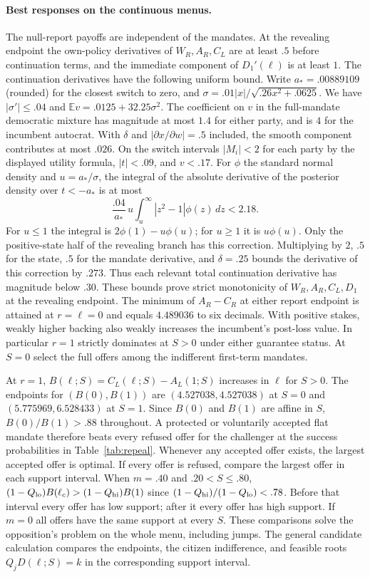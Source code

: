 \documentclass[11pt,letterpaper]{article}
\newcommand{\E}{\mathbb E}
\begin{document}
\paragraph{Best responses on the continuous menus.}
The null-report payoffs are independent of the mandates. At the revealing endpoint the own-policy derivatives of $W_R,A_R,C_L$ are at least $.5$ before continuation terms, and the immediate component of $D_1'(\ell)$ is at least $1$. The continuation derivatives have the following uniform bound. Write $a_* = .00889109$ (rounded) for the closest switch to zero, and $\sigma=.01|x|/\sqrt{.26x^2+.0625}$. We have $|\sigma'|\le .04$ and $\E v=.0125+32.25\sigma^2$. The coefficient on $v$ in the full-mandate democratic mixture has magnitude at most $1.4$ for either party, and is $4$ for the incumbent autocrat. With $\delta$ and $|\partial x/\partial w|=.5$ included, the smooth component contributes at most $.026$. On the switch intervals $|M_i|<2$ for each party by the displayed utility formula, $|t|<.09$, and $v<.17$. For $\phi$ the standard normal density and $u=a_*/\sigma$, the integral of the absolute derivative of the posterior density over $t<-a_*$ is at most
\[
 \frac{.04}{a_*}\,u\int_u^\infty |z^2-1|\phi(z)\,dz < 2.18 .
\]
For $u\le1$ the integral is $2\phi(1)-u\phi(u)$; for $u\ge1$ it is $u\phi(u)$. Only the positive-state half of the revealing branch has this correction. Multiplying by $2$, $.5$ for the state, $.5$ for the mandate derivative, and $\delta=.25$ bounds the derivative of this correction by $.273$. Thus each relevant total continuation derivative has magnitude below $.30$. These bounds prove strict monotonicity of $W_R,A_R,C_L,D_1$ at the revealing endpoint. The minimum of $A_R-C_R$ at either report endpoint is attained at $r=\ell=0$ and equals $4.489036$ to six decimals. With positive stakes, weakly higher backing also weakly increases the incumbent's post-loss value. In particular $r=1$ strictly dominates at $S>0$ under either guarantee status. At $S=0$ select the full offers among the indifferent first-term mandates.

At $r=1$, $B(\ell;S)=C_L(\ell;S)-A_L(1;S)$ increases in $\ell$ for $S>0$. The endpoints for $(B(0),B(1))$ are $(4.527038,4.527038)$ at $S=0$ and $(5.775969,6.528433)$ at $S=1$. Since $B(0)$ and $B(1)$ are affine in $S$, $B(0)/B(1)>.88$ throughout. A protected or voluntarily accepted flat mandate therefore beats every refused offer for the challenger at the success probabilities in Table~\ref{tab:repeal}. Whenever any accepted offer exists, the largest accepted offer is optimal. If every offer is refused, compare the largest offer in each support interval. When $m=.40$ and $.20<S\le .80$, $(1-Q_{\rm lo})B(\ell_c)>(1-Q_{\rm hi})B(1)$ since $(1-Q_{\rm hi})/(1-Q_{\rm lo})<.78$. Before that interval every offer has low support; after it every offer has high support. If $m=0$ all offers have the same support at every $S$. These comparisons solve the opposition's problem on the whole menu, including jumps. The general candidate calculation compares the endpoints, the citizen indifference, and feasible roots $Q_jD(\ell;S)=k$ in the corresponding support interval.
\end{document}

